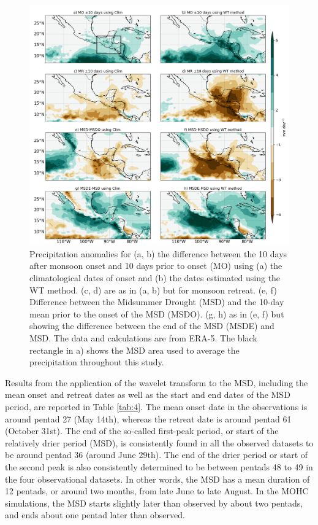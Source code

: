 \begin{figure}[t!]
\centering
 \includegraphics[width=0.95\linewidth]{figures/wav_fig10.png}
\caption[Precipitation anomalies after MSD]{  Precipitation anomalies for (a, b) the difference between the 10 days after monsoon onset and 10 days prior to onset (MO) using (a) the climatological dates of onset and (b) the dates estimated using the WT method. (c, d) are as in (a, b) but for monsoon retreat. (e, f) Difference between the Midsummer Drought (MSD) and the 10-day mean prior to the onset of the MSD (MSDO). (g, h) as in (e, f) but showing the difference between the end of the MSD (MSDE) and MSD. The data and calculations are from ERA-5. The black rectangle in a) shows the MSD area used to average the precipitation throughout this study.}
\label{fig:wav_fig11}
\end{figure}

Results from the application of the wavelet transform to the MSD, including the mean onset and retreat dates as well as the start and end dates of the MSD period, are reported in Table \ref{tab:4}.
The mean onset date in the observations is around pentad 27 (May 14th), whereas the retreat date is around pentad 61 (October 31st).
The end of the so-called first-peak period, or start of the relatively drier period (MSD), is consistently found in all the observed datasets to be around pentad 36 (around June 29th).
The end of the drier period or start of the second peak is also consistently determined to be between pentads 48 to 49 in the four observational datasets.
In other words, the MSD has a mean duration of 12 pentads, or around two months, from late June to late August.
In the MOHC simulations, the MSD starts slightly later than observed by about two pentads, and ends about one pentad later than observed.

